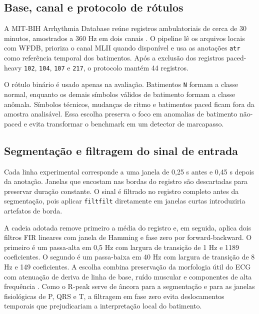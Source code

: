 \label{sec-methodology}

\subsection{Base, canal e protocolo de rótulos}

A MIT-BIH Arrhythmia Database reúne registros ambulatoriais de cerca de
30 minutos, amostrados a 360 Hz em dois canais
\citep{moody2001mitdb,physionetmitdb}. O pipeline lê os arquivos locais com
WFDB, prioriza o canal MLII quando disponível e usa as anotações \texttt{atr}
como referência temporal dos batimentos. Após a exclusão dos registros
paced-heavy \texttt{102}, \texttt{104}, \texttt{107} e \texttt{217}, o
protocolo mantém 44 registros.

O rótulo binário é usado apenas na avaliação. Batimentos \texttt{N} formam a
classe normal, enquanto os demais símbolos válidos de batimento formam a classe
anômala. Símbolos técnicos, mudanças de ritmo e batimentos paced ficam fora da
amostra analisável. Essa escolha preserva o foco em anomalias de batimento
não-paced e evita transformar o benchmark em um detector de marcapasso.

\subsection{Segmentação e filtragem do sinal de entrada}

Cada linha experimental corresponde a uma janela de 0,25 s antes e 0,45 s
depois da anotação. Janelas que encostam nas bordas do registro são descartadas
para preservar duração constante. O sinal é filtrado no registro completo antes
da segmentação, pois aplicar \texttt{filtfilt} diretamente em janelas curtas
introduziria artefatos de borda.

A cadeia adotada remove primeiro a média do registro e, em seguida, aplica dois
filtros FIR lineares com janela de Hamming e fase zero por forward-backward. O
primeiro é um passa-alta em 0,5 Hz com largura de transição de 1 Hz e
1189 coeficientes. O segundo é um passa-baixa em 40 Hz com largura de
transição de 8 Hz e 149 coeficientes. A escolha combina preservação da
morfologia útil do ECG com atenuação de deriva de linha de base, ruído muscular
e componentes de alta frequência \citep{thakor1984qrs,elgendi2017efficient,butt2020signalpiloted}.
Como o R-peak serve de âncora para a segmentação e para as janelas fisiológicas
de P, QRS e T, a filtragem em fase zero evita deslocamentos temporais que
prejudicariam a interpretação local do batimento.

